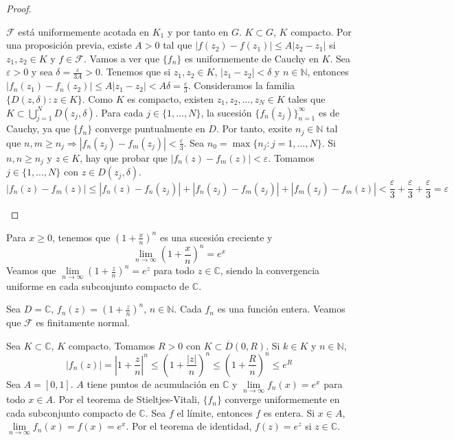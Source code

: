 \begin{proof}
\begin{enumerate}
              $\mathcal{F}$ está uniformemente acotada en $K_1$ y por tanto en $G$.
              $K \subset G$, $K$ compacto.
              Por una proposición previa, existe $A > 0$ tal que $|f(z_2)-f(z_1)| \leq A|z_2-z_1|$ si $z_1, z_2 \in K$ y $f \in \mathcal{F}$.
              Vamos a ver que $\{f_n\}$ es uniformemente de Cauchy en $K$.
              Sea $\varepsilon > 0$ y sea $\delta = \frac{\varepsilon}{3A} > 0$.
              Tenemos que si $z_1, z_2 \in K$, $|z_1-z_2| < \delta$ y $n \in \mathbb{N}$, entonces $|f_n(z_1)-f_n(z_2)| \leq A|z_1-z_2| < A\delta = \frac{\varepsilon}{3}$.
              Consideramos la familia $\{D(z, \delta) : z \in K\}$.
              Como $K$ es compacto, existen $z_1, z_2, \dots, z_N \in K$ tales que $K \subset \bigcup_{j=1}^N D(z_j, \delta)$.
              Para cada $j \in \{1, \dots, N\}$, la sucesión $\{f_n(z_j)\}_{n=1}^\infty$ es de Cauchy, ya que $\{f_n\}$ converge puntualmente en $D$.
              Por tanto, exsite $n_j \in \mathbb{N}$ tal que $n, m \geq n_j \Rightarrow |f_n(z_j)-f_m(z_j)| < \frac{\varepsilon}{3}$.
              Sea $n_0 = \max \{n_j : j = 1, \dots, N\}$.
              Si $n, n \geq n_j$ y $z \in K$, hay que probar que $|f_n(z)-f_m(z)| < \varepsilon$.
              Tomamos $j \in \{1, \dots, N\}$ con $z \in D(z_j, \delta)$.
              $$|f_n(z)-f_m(z)| \leq |f_n(z)-f_n(z_j)| + |f_n(z_j)-f_m(z_j)| + |f_m(z_j)-f_m(z)| < \frac{\varepsilon}{3} + \frac{\varepsilon}{3} + \frac{\varepsilon}{3} = \varepsilon$$
    \end{enumerate}
\end{proof}

\begin{example}
    Para $x \geq 0$, tenemos que $\left(1 + \frac{x}{n}\right)^n$ es una sucesión creciente y
    $$\lim\limits_{n \to \infty} \left(1 + \frac{x}{n}\right)^n = e^x$$
    Veamos que $\lim\limits_{n \to \infty} \left(1 + \frac{z}{n}\right)^n = e^z$ para todo $z \in \mathbb{C}$, siendo la convergencia uniforme en cada subconjunto compacto de $\mathbb{C}$.

    Sea $D = \mathbb{C}$, $f_n(z) = \left(1 + \frac{z}{n}\right)^n$, $n \in \mathbb{N}$.
    Cada $f_n$ es una función entera.
    Veamos que $\mathcal{F}$ es finitamente normal.

    Sea $K \subset \mathbb{C}$, $K$ compacto.
    Tomamos $R > 0$ con $K \subset \overline{D}(0, R)$.
    Si $k \in K$ y $n \in \mathbb{N}$,
    $$|f_n(z)| = \left|1 + \frac{z}{n}\right|^n \leq \left(1 + \frac{|z|}{n}\right)^n \leq \left(1 + \frac{R}{n}\right)^n \leq e^R$$
    Sea $A = [0, 1]$.
    $A$ tiene puntos de acumulación en $\mathbb{C}$ y $\lim\limits_{n \to \infty} f_n(x) = e^x$ para todo $x \in A$.
    Por el teorema de Stieltjes-Vitali, $\{f_n\}$ converge uniformemente en cada subconjunto compacto de $\mathbb{C}$.
    Sea $f$ el límite, entonces $f$ es entera.
    Si $x \in A$, $\lim\limits_{n \to \infty} f_n(x) = f(x) = e^x$.
    Por el teorema de identidad, $f(z) = e^z$ si $z \in \mathbb{C}$.
\end{example}

